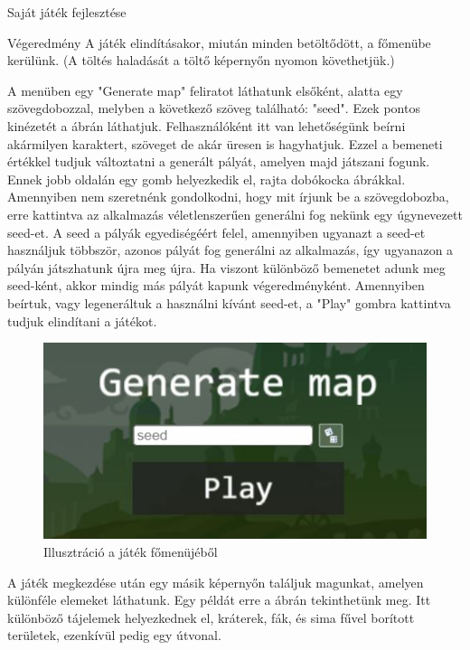 \begin{MyChapter}{Saját játék fejlesztése}
\begin{MySection}{Végeredmény}
		A játék elindításakor, miután minden betöltődött, a főmenübe kerülünk. (A töltés haladását a töltő képernyőn nyomon követhetjük.)

		A menüben egy "Generate map" feliratot láthatunk elsőként, alatta egy szövegdobozzal, melyben a következő szöveg található: "seed". Ezek pontos kinézetét a  ábrán láthatjuk. Felhasználóként itt van lehetőségünk beírni akármilyen karaktert, szöveget de akár üresen is hagyhatjuk. Ezzel a bemeneti értékkel tudjuk változtatni a generált pályát, amelyen majd játszani fogunk.
		Ennek jobb oldalán egy gomb helyezkedik el, rajta dobókocka ábrákkal. Amennyiben nem szeretnénk gondolkodni, hogy mit írjunk be a szövegdobozba, erre kattintva az alkalmazás véletlenszerűen generálni fog nekünk egy úgynevezett seed-et.
		A seed a pályák egyediségéért felel, amennyiben ugyanazt a seed-et használjuk többször, azonos pályát fog generálni az alkalmazás, így ugyanazon a pályán játszhatunk újra meg újra. Ha viszont különböző bemenetet adunk meg seed-ként, akkor mindig más pályát kapunk végeredményként. 
		Amennyiben beírtuk, vagy legeneráltuk a használni kívánt seed-et, a "Play" gombra kattintva tudjuk elindítani a játékot.
		
		\begin{figure}[H]
			\centering
			\includegraphics[scale=0.68]{kepek/jatekHasznalat/fomenu}
			\caption{Illusztráció a játék főmenüjéből}
			\label{fig:jatekHasznalat:fomenu}
		\end{figure}
		
		A játék megkezdése után egy másik képernyőn találjuk magunkat, amelyen különféle elemeket láthatunk. Egy példát erre a  ábrán tekinthetünk meg. Itt különböző tájelemek helyezkednek el, kráterek, fák, és sima fűvel borított területek, ezenkívül pedig egy útvonal. 
		

\end{MySection}
\end{MyChapter}
